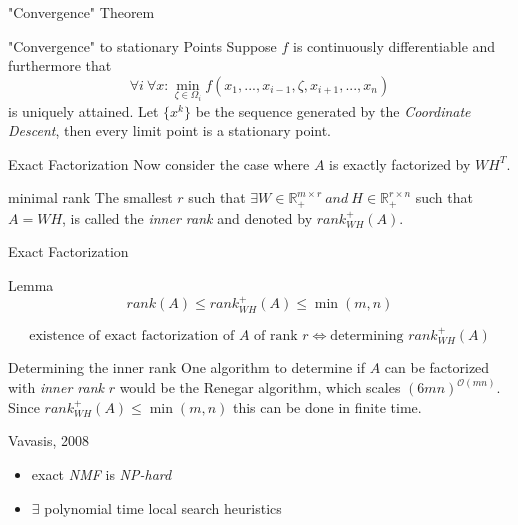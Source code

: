 \documentclass[aspectratio=169]{beamer}
\begin{document}
\begin{frame}{"Convergence" Theorem}
    \begin{block}{"Convergence" to stationary Points}
        Suppose $f$ is continuously differentiable and furthermore that \\
        \[\forall i \ \forall x: \min_{\zeta \in \Omega_i} f(x_1, ..., x_{i-1}, \zeta, x_{i+1}, ..., x_n)\] 
        is uniquely attained.
        Let \( \{x^k\} \) be the sequence generated by the \emph{Coordinate Descent}, then every limit point is a stationary point.
    \end{block}
\end{frame}

\begin{frame}{Exact Factorization}
    Now consider the case where $A$ is exactly factorized by $WH^T$.
    \begin{block}{minimal rank}
        The smallest $r$ such that \(\exists W \in \mathbb{R}^{m \times r}_+ \ and \ H \in \mathbb{R}^{r \times n}_+\) such that $A=WH$, is called the \emph{inner rank} and denoted by $rank_{WH}^+ (A)$. 
    \end{block}

\end{frame}

\begin{frame}{Exact Factorization}
    \begin{block}{Lemma}
        \[ rank(A) \leq rank_{WH}^+ (A) \leq \min(m,n)\]
    \end{block}
    
    \[\text{existence of exact factorization of $A$ of rank $r$} \iff \text{determining } rank_{WH}^+ (A) \]
\end{frame}

\begin{frame}{Determining the inner rank}
    One algorithm to determine if $A$ can be factorized with \emph{inner rank} $r$ would be the Renegar algorithm, which scales $(6mn)^{\mathcal{O}(mn)}$. \\
    Since $rank_{WH}^+ (A) \leq \min(m,n)$ this can be done in finite time.
    \begin{block}{Vavasis, 2008}
        \begin{itemize}
            \item exact \emph{NMF} is \emph{NP-hard}
            \item $\exists$ polynomial time local search heuristics
        \end{itemize}
    \end{block}
\end{frame}
\end{document}
